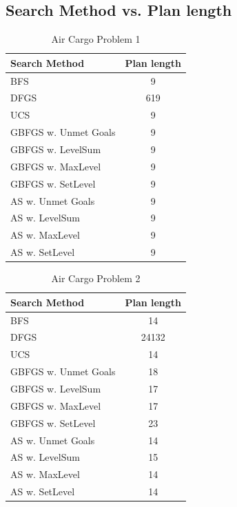 \documentclass[a4paper]{article}
\begin{document}
\newpage

\subsection{Search Method vs. Plan length}

\begin{table}[htpb]
    \caption{Air Cargo Problem 1}
    \centering
    \begin{tabular}{ l | c }
    Search Method & Plan length \\ \hline 
BFS & 9 \\
DFGS & 619 \\
UCS & 9 \\
GBFGS w. Unmet Goals & 9 \\
GBFGS w. LevelSum & 9 \\
GBFGS w. MaxLevel & 9 \\
GBFGS w. SetLevel & 9 \\
AS w. Unmet Goals & 9 \\
AS w. LevelSum & 9 \\
AS w. MaxLevel & 9 \\
AS w. SetLevel & 9
\end{tabular}
    \label{airps1}
    \end{table}

    
\begin{table}[htpb]
    \caption{Air Cargo Problem 2}
    \centering
    \begin{tabular}{ l | c }
    Search Method & Plan length \\ \hline 
BFS & 14 \\
DFGS & 24132 \\
UCS & 14 \\
GBFGS w. Unmet Goals & 18 \\
GBFGS w. LevelSum & 17 \\
GBFGS w. MaxLevel & 17 \\
GBFGS w. SetLevel & 23 \\
AS w. Unmet Goals & 14 \\
AS w. LevelSum & 15 \\
AS w. MaxLevel & 14 \\
AS w. SetLevel & 14
\end{tabular}
    \label{airps2}
    \end{table}
\end{document}
